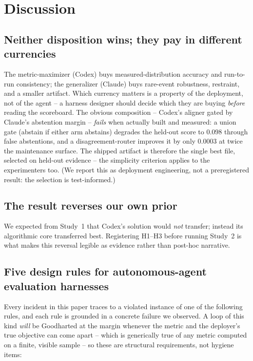 \documentclass[runningheads]{llncs}
\begin{document}
\section{Discussion}
\label{sec:discussion}

\subsection{Neither disposition wins; they pay in different currencies}
The
metric-maximizer (Codex) buys measured-distribution accuracy and run-to-run
consistency; the generalizer (Claude) buys rare-event robustness, restraint,
and a smaller artifact. Which currency matters is a property of the
deployment, not of the agent -- a harness designer should decide which they
are buying \emph{before} reading the scoreboard. The obvious composition --
Codex's aligner gated by Claude's abstention margin -- \emph{fails} when
actually built and measured: a union gate (abstain if either arm abstains)
degrades the held-out score to $0.098$ through false abstentions, and a
disagreement-router improves it by only $0.0003$ at twice the maintenance
surface. The shipped artifact is therefore the single best file, selected
on held-out evidence -- the simplicity criterion applies to the
experimenters too. (We report this as deployment engineering, not a
preregistered result: the selection is test-informed.)

\subsection{The result reverses our own prior}
We expected from Study~1 that Codex's solution would \emph{not} transfer;
instead its algorithmic core transferred best. Registering H1--H3 before
running Study~2 is what makes this reversal legible as evidence rather than
post-hoc narrative.

\subsection{Five design rules for autonomous-agent evaluation harnesses}
\label{sec:rules}
Every incident in this paper traces to a violated instance of one of the
following rules, and each rule is grounded in a concrete failure we
observed. A loop of this kind \emph{will} be Goodharted at the margin
whenever the metric and the deployer's true objective can come apart --
which is generically true of any metric computed on a finite, visible
sample -- so these are structural requirements, not hygiene items:
\end{document}
